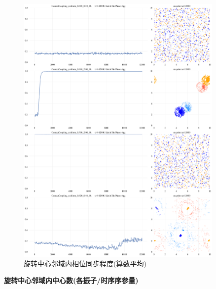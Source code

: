 \documentclass{article}
\begin{document}
\begin{figure}[H]
	\centering
	\includegraphics[width=0.9\textwidth]{./figs/limitDisPhaseSyncOp_ts.png}
	\caption{旋转中心邻域内相位同步程度(算数平均)}
	\label{fig:fig234t.3}
\end{figure}



\newpage
\noindent\textbf{旋转中心邻域内中心数(各振子/时序序参量)}
\end{document}
